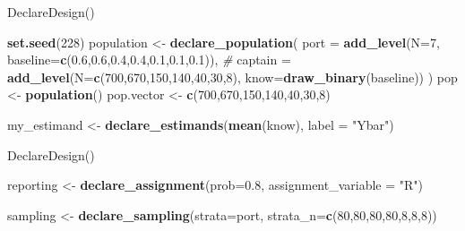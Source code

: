 \documentclass[ignorenonframetext,]{beamer}
\newenvironment{Shaded}{\begin{snugshade}}{\end{snugshade}}
\newcommand{\CommentTok}[1]{\textcolor[rgb]{0.56,0.35,0.01}{\textit{#1}}}
\newcommand{\DataTypeTok}[1]{\textcolor[rgb]{0.13,0.29,0.53}{#1}}
\newcommand{\DecValTok}[1]{\textcolor[rgb]{0.00,0.00,0.81}{#1}}
\newcommand{\FloatTok}[1]{\textcolor[rgb]{0.00,0.00,0.81}{#1}}
\newcommand{\KeywordTok}[1]{\textcolor[rgb]{0.13,0.29,0.53}{\textbf{#1}}}
\newcommand{\NormalTok}[1]{#1}
\newcommand{\StringTok}[1]{\textcolor[rgb]{0.31,0.60,0.02}{#1}}
\begin{document}
\begin{frame}[fragile]{DeclareDesign()}
\protect\hypertarget{declaredesign}{}

\begin{Shaded}
\begin{Highlighting}[]
\KeywordTok{set.seed}\NormalTok{(}\DecValTok{228}\NormalTok{)}
\NormalTok{population <-}\StringTok{ }\KeywordTok{declare_population}\NormalTok{(}
  \DataTypeTok{port =} \KeywordTok{add_level}\NormalTok{(}\DataTypeTok{N=}\DecValTok{7}\NormalTok{,}
         \DataTypeTok{baseline=}\KeywordTok{c}\NormalTok{(}\FloatTok{0.6}\NormalTok{,}\FloatTok{0.6}\NormalTok{,}\FloatTok{0.4}\NormalTok{,}\FloatTok{0.4}\NormalTok{,}\FloatTok{0.1}\NormalTok{,}\FloatTok{0.1}\NormalTok{,}\FloatTok{0.1}\NormalTok{)), }\CommentTok{# }
  \DataTypeTok{captain =} \KeywordTok{add_level}\NormalTok{(}\DataTypeTok{N=}\KeywordTok{c}\NormalTok{(}\DecValTok{700}\NormalTok{,}\DecValTok{670}\NormalTok{,}\DecValTok{150}\NormalTok{,}\DecValTok{140}\NormalTok{,}\DecValTok{40}\NormalTok{,}\DecValTok{30}\NormalTok{,}\DecValTok{8}\NormalTok{),}
                      \DataTypeTok{know=}\KeywordTok{draw_binary}\NormalTok{(baseline))}
\NormalTok{)}
\NormalTok{pop <-}\StringTok{ }\KeywordTok{population}\NormalTok{()}
\NormalTok{pop.vector <-}\StringTok{ }\KeywordTok{c}\NormalTok{(}\DecValTok{700}\NormalTok{,}\DecValTok{670}\NormalTok{,}\DecValTok{150}\NormalTok{,}\DecValTok{140}\NormalTok{,}\DecValTok{40}\NormalTok{,}\DecValTok{30}\NormalTok{,}\DecValTok{8}\NormalTok{)}

\NormalTok{my_estimand <-}\StringTok{ }\KeywordTok{declare_estimands}\NormalTok{(}\KeywordTok{mean}\NormalTok{(know),}
                                 \DataTypeTok{label =} \StringTok{"Ybar"}\NormalTok{)}
\end{Highlighting}
\end{Shaded}

\end{frame}

\begin{frame}[fragile]{DeclareDesign()}
\protect\hypertarget{declaredesign-1}{}

\begin{Shaded}
\begin{Highlighting}[]
\NormalTok{reporting <-}\StringTok{ }\KeywordTok{declare_assignment}\NormalTok{(}\DataTypeTok{prob=}\FloatTok{0.8}\NormalTok{,}
                  \DataTypeTok{assignment_variable =} \StringTok{"R"}\NormalTok{)}

\NormalTok{sampling <-}\StringTok{ }\KeywordTok{declare_sampling}\NormalTok{(}\DataTypeTok{strata=}\NormalTok{port,}
               \DataTypeTok{strata_n=}\KeywordTok{c}\NormalTok{(}\DecValTok{80}\NormalTok{,}\DecValTok{80}\NormalTok{,}\DecValTok{80}\NormalTok{,}\DecValTok{80}\NormalTok{,}\DecValTok{8}\NormalTok{,}\DecValTok{8}\NormalTok{,}\DecValTok{8}\NormalTok{))}
\end{Highlighting}
\end{Shaded}

\end{frame}
\end{document}
